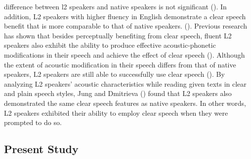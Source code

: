 \documentclass[
  man,
  floatsintext,
  longtable,
  nolmodern,
  notxfonts,
  notimes,
  colorlinks=true,linkcolor=blue,citecolor=blue,urlcolor=blue]{apa7}
\begin{document}
difference between l2 speakers and native speakers is not significant
(). In
addition, L2 speakers with higher fluency in English demonstrate a clear
speech benefit that is more comparable to that of native speakers.
(). Previous research has shown that besides perceptually benefiting
from clear speech, fluent L2 speakers also exhibit the ability to
produce effective acoustic-phonetic modifications in their speech and
achieve the effect of clear speech
().
Although the extent of acoustic modification in their speech differs
from that of native speakers, L2 speakers are still able to successfully
use clear speech (). By analyzing L2 speakers' acoustic characteristics while reading
given texts in clear and plain speech styles, Jung and Dmitrieva
() found that L2 speakers also
demonstrated the same clear speech features as native speakers. In other
words, L2 speakers exhibited their ability to employ clear speech when
they were prompted to do so.

\subsection{Present Study}\label{sec-present-study}
\end{document}
